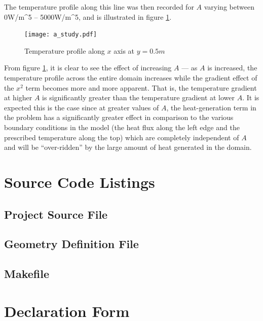 \documentclass[letterpaper,10pt]{article}
\begin{document}
The temperature profile along this line was then recorded for $A$ varying between \unit{0}{W/m^5} -- \unit{5000}{W/m^5}, and is illustrated in figure \ref{fig:a_study}.

\begin{figure}[H]
	\centering
	\texttt{[image: a\_study.pdf]}
	\caption{Temperature profile along $x$ axis at $y=\unit{0.5}{m}$}
	\label{fig:a_study}
\end{figure}

From figure \ref{fig:a_study}, it is clear to see the effect of increasing $A$ --- as $A$ is increased, the temperature profile across the entire domain increases while the gradient effect of the $x^2$ term becomes more and more apparent. That is, the temperature gradient at higher $A$ is significantly greater than the temperature gradient at lower $A$. It is expected this is the case since at greater values of $A$, the heat-generation term in the problem has a significantly greater effect in comparison to the various boundary conditions in the model (the heat flux along the left edge and the prescribed temperature along the top) which are completely independent of $A$ and will be ``over-ridden'' by the large amount of heat generated in the domain.

\pagebreak
\appendix
\addappheadtotoc
\makeatletter
\def\@seccntformat#1{Appendix\ \csname the#1\endcsname:\ }
\makeatother
\renewcommand{\thepage}{\thesection-\arabic{page}}
\setcounter{page}{1}

\section{Source Code Listings}
\label{app:source}
\subsection{Project Source File}

\subsection{Geometry Definition File}

\subsection{Makefile}


\pagebreak
\setcounter{page}{1}
\section{Declaration Form}
\begin{center}
{%
\setlength{\fboxsep}{0pt}%
\setlength{\fboxrule}{1pt}%
%
}%
\end{center}
\end{document}
